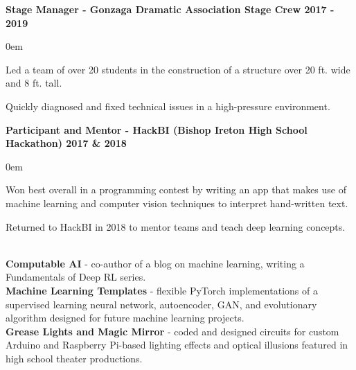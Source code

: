 \documentclass{article}
\begin{document}
\begin{center}
\begin{flushleft}
    \textbf{Stage Manager - Gonzaga Dramatic Association Stage Crew \hfill 2017 - 2019}
    \begin{compactitem}
      \itemsep0em
      \item Led a team of over 20 students in the construction of a structure over 20 ft. wide and 8 ft. tall.
      \item Quickly diagnosed and fixed technical issues in a high-pressure environment.
    \end{compactitem}

    \textbf{Participant and Mentor - HackBI  (Bishop Ireton High School Hackathon) \hfill 2017 \& 2018}
    \begin{compactitem}
      \itemsep0em
      \item Won best overall in a programming contest by writing an app that makes use of machine learning and computer vision techniques to interpret hand-written text.
      \item Returned to HackBI in 2018 to mentor teams and teach deep learning concepts.
    \end{compactitem}


    {\large\textbf{\underline{}}} \\
    \textbf{Computable AI} - co-author of a blog on machine learning, writing a Fundamentals of Deep RL series. \\
    \textbf{Machine Learning Templates} - flexible PyTorch implementations of a supervised learning neural network, autoencoder, GAN, and evolutionary algorithm designed for future machine learning projects. \\
    \textbf{Grease Lights and Magic Mirror} - coded and designed circuits for custom Arduino and Raspberry Pi-based lighting effects and optical illusions featured in high school theater productions.

  \end{flushleft}
\end{center}
\end{document}
